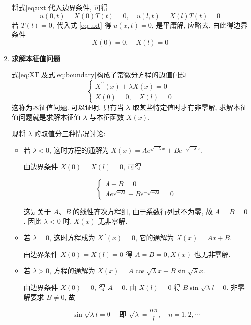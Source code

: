 \begin{solution}
\begin{enumerate}
将式\eqref{eq:uxt}代入边界条件, 可得
$$
u(0, t)=X(0) T(t)=0, \quad u(l, t)=X(l) T(t)=0
$$
若 $T(t)=0$, 代入式 \eqref{eq:uxt} 得 $u(x, t)=0$, 是平庸解, 应略去. 由此得边界条件
\begin{equation}
    X(0)=0, \quad X(l)=0
    \label{eq:boundary}
\end{equation}

\item \textbf{求解本征值问题}

式\eqref{eq:XT}及式\eqref{eq:boundary}构成了常微分方程的边值问题
$$
\left\{\begin{array}{l}
X^{\prime \prime}(x)+\lambda X(x)=0 \\
X(0)=0, \quad X(l)=0
\end{array}\right.
$$
这称为本征值问题. 
可以证明, 只有当 $\lambda$ 取某些特定值时才有非零解,
求解本征值问题就是求解本征值 $\lambda$ 与本征函数 $X(x)$.

现将 $\lambda$ 的取值分三种情况讨论:

\begin{itemize}
    \item 若 $\lambda<0$, 这时方程的通解为 $X(x)=A e^{\sqrt{-\lambda} x}+B e^{-\sqrt{-\lambda} x}$.

        由边界条件 $X(0)=X(l)=0$, 可得
        
        $$
        \left\{\begin{array}{l}
        A+B=0 \\
        A e^{\sqrt{-\lambda l}}+B e^{-\sqrt{-\lambda l}}=0
        \end{array}\right.
        $$
        
        这是关于 $A 、 B$ 的线性齐次方程组, 由于系数行列式不为零, 故 $A=B=0$. 因此 $\lambda<0$ 时, $X(x)$ 无非零解.

    \item 若 $\lambda=0$, 这时方程成为 $X^{\prime \prime}(x)=0$, 它的通解为 $X(x)=A x+B$.

        由边界条件 $X(0)=X(l)=0$ 得 $A=B=0, X(x)$ 也无非零解.
    
    \item 若 $\lambda>0$, 方程的通解为 $X(x)=A \cos \sqrt{\lambda} x+B \sin \sqrt{\lambda} x$.

        由边界条件 $X(0)=0$, 得 $A=0$. 由 $X(l)=0$ 得 $B \sin \sqrt{\lambda} l=0$. 非零解要求 $B \neq 0$, 故
        
        $$
        \sin \sqrt{\lambda} l=0 \quad \text { 即 } \sqrt{\lambda}=\frac{n \pi}{l}, \quad n=1,2, \cdots
        $$
        

\end{itemize}
\end{enumerate}
\end{solution}
